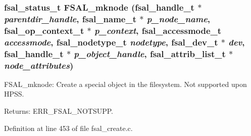 \subsubsection[{FSAL\_\-mknode}]{\setlength{\rightskip}{0pt plus 5cm}fsal\_\-status\_\-t FSAL\_\-mknode (fsal\_\-handle\_\-t $\ast$ {\em parentdir\_\-handle}, \/  fsal\_\-name\_\-t $\ast$ {\em p\_\-node\_\-name}, \/  fsal\_\-op\_\-context\_\-t $\ast$ {\em p\_\-context}, \/  fsal\_\-accessmode\_\-t {\em accessmode}, \/  fsal\_\-nodetype\_\-t {\em nodetype}, \/  fsal\_\-dev\_\-t $\ast$ {\em dev}, \/  fsal\_\-handle\_\-t $\ast$ {\em p\_\-object\_\-handle}, \/  fsal\_\-attrib\_\-list\_\-t $\ast$ {\em node\_\-attributes})}\label{fsal__create_8c_344a6fd2ad23cc03509f7e7f3bf1fd1c}


FSAL\_\-mknode: Create a special object in the filesystem. Not supported upon HPSS.

\begin{Desc}
\item[Returns:]ERR\_\-FSAL\_\-NOTSUPP. \end{Desc}


Definition at line 453 of file fsal\_\-create.c.